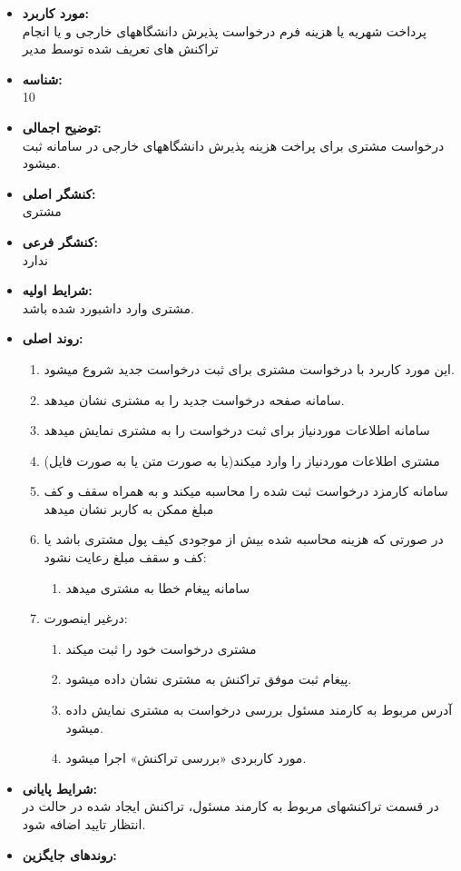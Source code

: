 \documentclass{article}
\begin{document}
\noindent\makebox[\linewidth]{\rule{\paperwidth}{0.4pt}}

\begin{itemize}
\item \textbf{مورد کاربرد:}\\
پرداخت شهریه یا هزینه فرم درخواست پذیرش دانشگاههای خارجی و یا انجام تراکنش های تعریف شده توسط مدیر
\item \textbf{شناسه:}\\
10
\item \textbf{توضیح اجمالی:}\\
درخواست مشتری برای پراخت هزینه پذیرش دانشگاههای خارجی در سامانه ثبت میشود.
\item \textbf{کنشگر اصلی:}\\
مشتری
\item \textbf{کنشگر فرعی:}\\
ندارد
\item \textbf{شرایط اولیه:}\\
مشتری وارد داشبورد شده باشد.
\item \textbf{روند اصلی:}\\
\begin{enumerate}
\item  این مورد کاربرد با درخواست مشتری برای ثبت درخواست جدید شروع میشود.
\item سامانه صفحه درخواست جدید را به مشتری نشان میدهد.
\item سامانه اطلاعات موردنیاز برای ثبت درخواست را به مشتری نمایش میدهد
\item مشتری اطلاعات موردنیاز را وارد میکند(یا به صورت متن یا به صورت فایل)
\item سامانه کارمزد درخواست ثبت شده را محاسبه میکند و به همراه سقف و کف مبلغ ممکن به کاربر نشان میدهد
\item در صورتی که هزینه محاسبه شده بیش از موجودی کیف پول مشتری باشد یا کف و سقف مبلغ رعایت نشود:
\begin{enumerate}
\item سامانه پیغام خطا به مشتری میدهد
\end{enumerate}
\item درغیر اینصورت:
\begin{enumerate}
\item مشتری درخواست خود را ثبت میکند
\item پیغام ثبت موفق تراکنش به مشتری نشان داده میشود.
\item آدرس مربوط به کارمند مسئول بررسی درخواست به مشتری نمایش داده میشود.
\item مورد کاربردی «بررسی تراکنش» اجرا میشود.
\end{enumerate}

\end{enumerate}
\item \textbf{شرایط پایانی:}\\ 
در قسمت تراکنشهای مربوط به کارمند مسئول، تراکنش ایجاد شده در حالت در انتظار تایید اضافه شود.
\item \textbf{روندهای جایگزین:}\\
\end{itemize}
\end{document}
